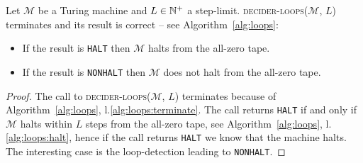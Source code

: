 \begin{theorem}\label{th:loops}
    Let $\mathcal{M}$ be a Turing machine and $L \in \mathbb{N}^+$ a step-limit. \textsc{decider-loops}($\mathcal{M}$, $L$) terminates and its result is correct -- see Algorithm~\ref{alg:loops}:
    \begin{itemize}
        \item If the result is \texttt{HALT} then $\mathcal{M}$ halts from the all-zero tape.
        \item If the result is \texttt{NONHALT} then $\mathcal{M}$ does not halt from the all-zero tape.
    \end{itemize}
\end{theorem}
\begin{proof}
    The call to \textsc{decider-loops}($\mathcal{M}$, $L$) terminates because of Algorithm~\ref{alg:loops}, l.\ref{alg:loops:terminate}. The call returns \texttt{HALT} if and only if $\mathcal{M}$ halts within $L$ steps from the all-zero tape, see Algorithm~\ref{alg:loops}, l.\ref{alg:loops:halt}, hence if the call returns \texttt{HALT} we know that the machine halts. The interesting case is the loop-detection leading to \texttt{NONHALT}.




\end{proof}
